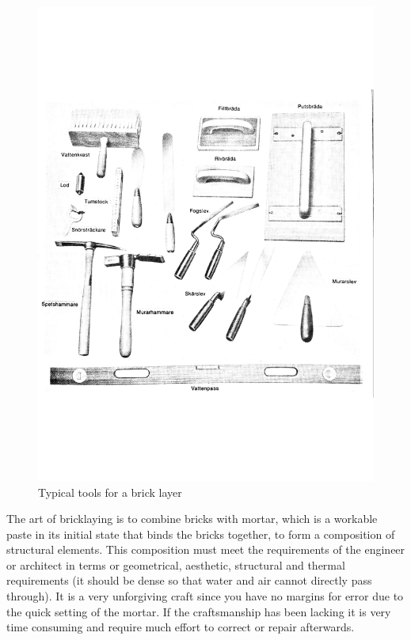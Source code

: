 \begin{figure}[H]
\centering
\includegraphics[width=0.8\linewidth ]{figure/Theory/tools.pdf}
\caption{Typical tools for a brick layer}
\end{figure}

The art of bricklaying is to combine  bricks with mortar, which is a workable paste in its initial state that binds the bricks together, to form a composition of structural elements. This composition must meet the requirements of the engineer or architect in terms or geometrical, aesthetic, structural and thermal requirements (it should be dense so that water and air cannot directly pass through). It is a very unforgiving craft since you have no margins for error due to the quick setting of the mortar. If the craftsmanship has been lacking it is very time consuming and require much effort to correct or repair afterwards. 

